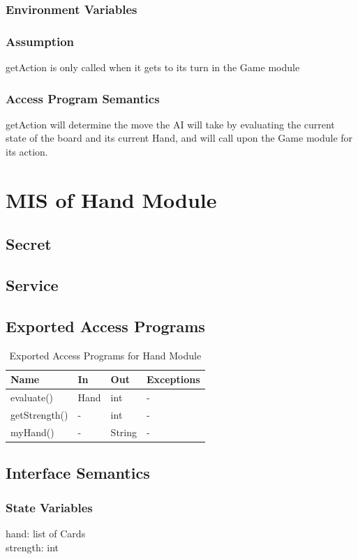 \documentclass[11pt]{article}
\begin{document}
    \subsubsection{Environment Variables}
    \subsubsection{Assumption}
    getAction is only called when it gets to its turn in the Game module
    \subsubsection{Access Program Semantics}
    getAction will determine the move the AI will take by evaluating the current state of the board and its current Hand, and will call upon the Game module for its action. 
    \newline
    \section{MIS of Hand Module}
     \subsection{Secret}
    \subsection{Service}
    \subsection{Exported Access Programs}
    \begin{table}[h]
    \caption{Exported Access Programs for Hand Module}
    \begin{tabular}{p{4cm}p{2cm}p{2cm}p{4cm}}
    Name & In & Out & Exceptions\\
    \hline
    evaluate() & Hand & int & -\\
    \hline
    getStrength() & - & int & -\\
    \hline
    myHand() & - & String & - \\
    \hline
    \end{tabular}
    \end{table}
    \subsection{Interface Semantics}
    \subsubsection{State Variables}
    hand: list of Cards\\
    strength: int
\end{document}
